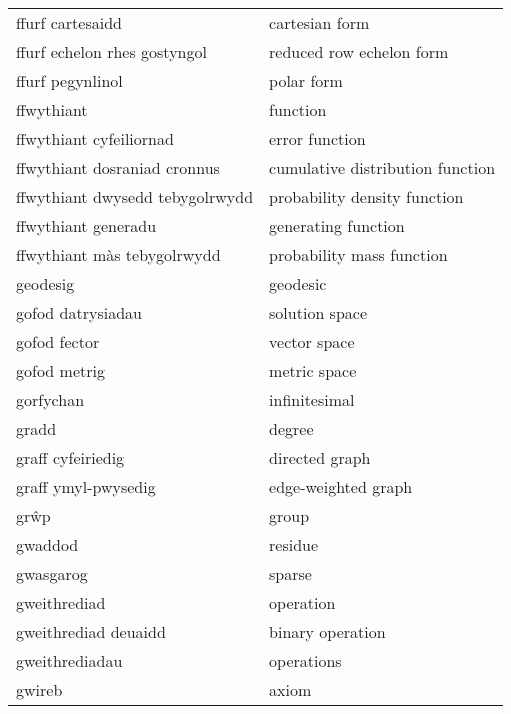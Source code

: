 \begin{supertabular}{p{0.22\textwidth}p{0.22\textwidth}}
                ffurf cartesaidd &                    cartesian form \\
    ffurf echelon rhes gostyngol &          reduced row echelon form \\
                ffurf pegynlinol &                        polar form \\
                      ffwythiant &                          function \\
         ffwythiant cyfeiliornad &                    error function \\
    ffwythiant dosraniad cronnus &  cumulative distribution function \\
 ffwythiant dwysedd tebygolrwydd &      probability density function \\
             ffwythiant generadu &               generating function \\
     ffwythiant màs tebygolrwydd &         probability mass function \\
                        geodesig &                          geodesic \\
               gofod datrysiadau &                    solution space \\
                    gofod fector &                      vector space \\
                    gofod metrig &                      metric space \\
                       gorfychan &                     infinitesimal \\
                           gradd &                            degree \\
               graff cyfeiriedig &                    directed graph \\
             graff ymyl-pwysedig &               edge-weighted graph \\
                            grŵp &                             group \\
                         gwaddod &                           residue \\
                       gwasgarog &                            sparse \\
                    gweithrediad &                         operation \\
            gweithrediad deuaidd &                  binary operation \\
                  gweithrediadau &                        operations \\
                          gwireb &                             axiom \\

\end{supertabular}
